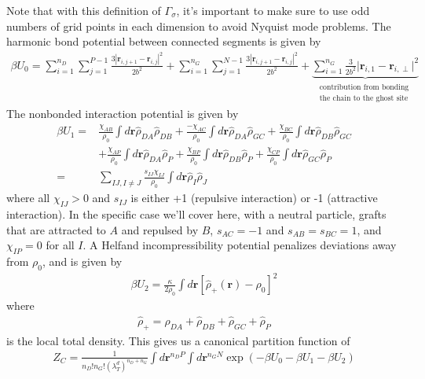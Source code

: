 \documentclass{article}
\begin{document}
  Note that with this definition of $\Gamma_\sigma$, it's important to make sure
    to use odd numbers of grid points in each dimension to avoid Nyquist mode
    problems.
  The harmonic bond potential between connected segments is given by
  \begin{align*}
    \beta U_0 =
      \sum_{i=1}^{n_D} \sum_{j=1}^{P-1}
      \frac{3 \left| \mathbf{r}_{i,j+1} - \mathbf{r}_{i,j} \right| ^ 2 }
           { 2 b^2 }
      +
      \sum_{i=1}^{n_G} \sum_{j=1}^{N-1}
      \frac{3 \left| \mathbf{r}_{i,j+1} - \mathbf{r}_{i,j} \right| ^ 2 }
           { 2 b^2 }
      +
      \underbrace{\sum_{i=1}^{n_G}  \frac{3}{2b^2} 
      \vert \mathbf{r}_{i,1} - \mathbf{r}_{i,\perp} \vert^2}_
      {\substack{\text{contribution from bonding } \\
      \text{the chain  to the ghost site }}}
  \end{align*}
  The nonbonded interaction potential is given by
  \begin{align*}
    \beta U_1 =&
      \frac{\chi_{AB}}{\rho_0} \int d\mathbf{r} \hat{\rho}_{DA} \hat{\rho}_{DB}
      + \frac{-\chi_{AC}}{\rho_0} \int d\mathbf{r} \hat{\rho}_{DA} \hat{\rho}_{GC}
      + \frac{\chi_{BC}}{\rho_0} \int d\mathbf{r} \hat{\rho}_{DB} \hat{\rho}_{GC}
      \\
      &+ \frac{\chi_{AP}}{\rho_0} \int d\mathbf{r} \hat{\rho}_{DA} \hat{\rho}_P
      + \frac{\chi_{BP}}{\rho_0} \int d\mathbf{r} \hat{\rho}_{DB} \hat{\rho}_P
      + \frac{\chi_{CP}}{\rho_0} \int d\mathbf{r} \hat{\rho}_{GC} \hat{\rho}_P \\
    =&
      \sum_{IJ, I \ne J} \frac{s_{IJ}\chi_{IJ}}{\rho_0}
      \int d \mathbf{r} \hat{\rho}_I \hat{\rho}_J
  \end{align*}
  where all $\chi_{IJ} > 0$ and $s_{IJ}$ is either +1 (repulsive interaction) or
    -1 (attractive interaction).
  In the specific case we'll cover here, with a neutral particle, grafts that
    are attracted to $A$ and repulsed by $B$, $s_{AC} = -1$ and
    $s_{AB} = s_{BC} = 1$, and $\chi_{IP} = 0$ for all $I$.
  A Helfand incompressibility potential penalizes deviations away from $\rho_0$,
    and is given by
  \begin{align*}
    \beta U_2 = \frac{\kappa}{2 \rho_0} \int d \mathbf{r}
      \left[ \hat{\rho}_+ (\mathbf{r}) - \rho_0 \right] ^ 2
  \end{align*}
  where
  \begin{align*}
    \hat{\rho}_+ =
      \hat{\rho}_{DA} + \hat{\rho}_{DB} + \hat{\rho}_{GC} + \hat{\rho}_P
  \end{align*}
    is the local total density.
  This gives us a canonical partition function of
  \begin{align*}
    Z_C = \frac{1}{n_D!n_G! \left( \lambda_T^d \right)^{n_D+n_G}}
      \int d \mathbf{r}^{n_DP} \int d \mathbf{r}^{n_GN}
      \exp \left( -\beta U_0 - \beta U_1 - \beta U_2 \right)
  \end{align*}
  
\end{document}
